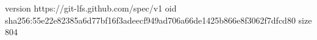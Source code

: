 version https://git-lfs.github.com/spec/v1
oid sha256:55e22e82385a6d77bf16f3adeecf949ad706a66de1425b866e8f3062f7dfcd80
size 804
